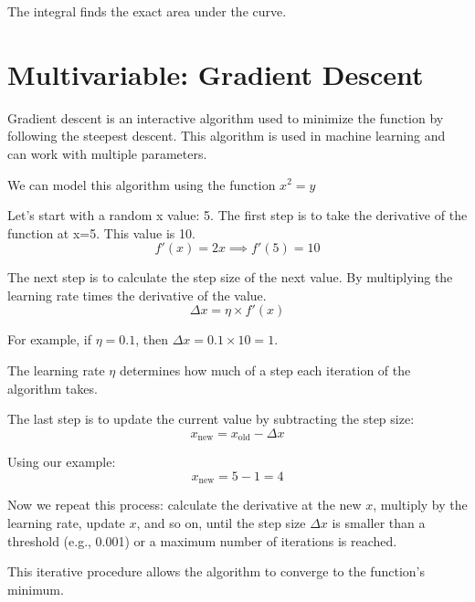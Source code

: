 \documentclass{article}
\begin{document}
\vspace{1em}

\noindent
The integral finds the exact area under the curve.

\newpage

\section{Multivariable: Gradient Descent}
\noindent
Gradient descent is an interactive algorithm used to minimize the function by following the steepest descent. This algorithm is used in machine learning and can work with multiple parameters.

\vspace{1em}

\noindent
We can model this algorithm using the function \( x^2 = y \)

\vspace{1em}

\noindent
Let's start with a random x value: 5. The first step is to take the derivative of the function at x=5. This value is 10.
\[
f'(x) = 2x \implies f'(5) = 10
\]

\vspace{1em}

\noindent
The next step is to calculate the step size of the next value. By multiplying the learning rate times the derivative of the value.
\[
\Delta x = \eta \times f'(x)
\]

For example, if \( \eta = 0.1 \), then \( \Delta x = 0.1 \times 10 = 1 \).

\vspace{1em}

\noindent
The learning rate \( \eta \) determines how much of a step each iteration of the algorithm takes.

\vspace{1em}

\noindent
The last step is to update the current value by subtracting the step size:
\[
x_{\text{new}} = x_{\text{old}} - \Delta x
\]

Using our example:
\[
x_{\text{new}} = 5 - 1 = 4
\]


\vspace{1em}

\noindent
Now we repeat this process: calculate the derivative at the new \( x \), multiply by the learning rate, update \( x \), and so on, until the step size \( \Delta x \) is smaller than a threshold (e.g., 0.001) or a maximum number of iterations is reached.

\vspace{1em}
\noindent
This iterative procedure allows the algorithm to converge to the function's minimum.
\end{document}
